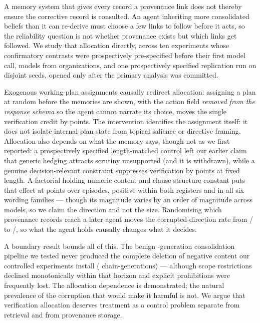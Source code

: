 A memory system that gives every record a provenance link does not thereby
ensure the corrective record is consulted. An agent inheriting more consolidated
beliefs than it can re-derive must choose a few links to follow before it acts,
so the reliability question is not whether provenance exists but which links get
followed. We study that allocation directly, across ten experiments whose confirmatory contrasts were prospectively pre-specified before their first model call, \SixModels{} models from \SixOrgs{} organizations, and one prospectively specified replication run on disjoint seeds, opened only after the primary analysis was committed.

Exogenous working-plan assignments causally redirect allocation: assigning a
plan at random before the memories are shown, with the action field
\emph{removed from the response schema} so the agent cannot narrate its choice,
moves the single verification credit by \SevenDelta{} points. The intervention
identifies the assignment itself: it does not isolate internal plan state from
topical salience or directive framing. Allocation also depends on what the
memory says, though not as we first reported: a prospectively specified length-matched control left our earlier claim that generic hedging attracts scrutiny unsupported (and it is withdrawn),
while a genuine decision-relevant constraint suppresses verification by
\EightCaveatVsPadded{} points at fixed length. A factorial holding numeric
content and clause structure constant puts that effect at \TenPooled{} points
over \TenContrastN{} episodes, positive within both registers and in all six
wording families --- though its magnitude varies by an order of magnitude across
models, so we claim the direction and not the size. Randomising which provenance
records reach a later agent moves the corrupted-direction rate from
\ThreeBOthK/\ThreeBOthN{} to \ThreeBTgtK/\ThreeBTgtN, so what the agent holds
causally changes what it decides.

A boundary result bounds all of this. The benign
\FiveGenerations-generation consolidation pipeline we tested never produced the
complete deletion of negative content our controlled experiments install
(\FivePurelyPositive{} chain-generations) --- although scope restrictions
declined monotonically within that horizon and explicit prohibitions were
frequently lost. The allocation dependence is demonstrated; the natural
prevalence of the corruption that would make it harmful is not. We argue that
verification allocation deserves treatment as a control problem separate from
retrieval and from provenance storage.
